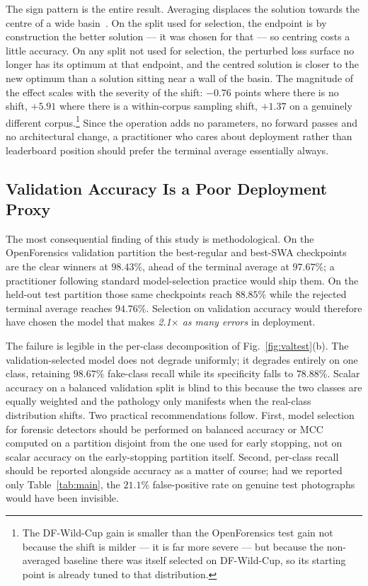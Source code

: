 \documentclass[10pt,journal]{IEEEtran}
\begin{document}
The sign pattern is the entire result. Averaging displaces the solution
towards the centre of a wide basin~\cite{izmailov2018swa}. On the split used
for selection, the endpoint is by construction the better solution --- it was
chosen for that --- so centring costs a little accuracy. On any split not used
for selection, the perturbed loss surface no longer has its optimum at that
endpoint, and the centred solution is closer to the new optimum than a
solution sitting near a wall of the basin. The magnitude of the effect scales
with the severity of the shift: $-0.76$ points where there is no shift,
$+5.91$ where there is a within-corpus sampling shift, $+1.37$ on a genuinely
different corpus.\footnote{The DF-Wild-Cup gain is smaller than the
OpenForensics test gain not because the shift is milder --- it is far more
severe --- but because the non-averaged baseline there was itself selected on
DF-Wild-Cup, so its starting point is already tuned to that distribution.}
Since the operation adds no parameters, no forward passes and no
architectural change, a practitioner who cares about deployment rather than
leaderboard position should prefer the terminal average essentially always.

\subsection{Validation Accuracy Is a Poor Deployment Proxy}
The most consequential finding of this study is methodological. On the
OpenForensics validation partition the best-regular and best-SWA checkpoints
are the clear winners at $98.43\%$, ahead of the terminal average at
$97.67\%$; a practitioner following standard model-selection practice would
ship them. On the held-out test partition those same checkpoints reach
$88.85\%$ while the rejected terminal average reaches $94.76\%$. Selection on
validation accuracy would therefore have chosen the model that makes
\emph{2.1$\times$ as many errors} in deployment.

The failure is legible in the per-class decomposition of
Fig.~\ref{fig:valtest}(b). The validation-selected model does not degrade
uniformly; it degrades entirely on one class, retaining $98.67\%$ fake-class
recall while its specificity falls to $78.88\%$. Scalar accuracy on a balanced
validation split is blind to this because the two classes are equally
weighted and the pathology only manifests when the real-class distribution
shifts. Two practical recommendations follow. First, model selection for
forensic detectors should be performed on balanced accuracy or MCC computed on
a partition disjoint from the one used for early stopping, not on scalar
accuracy on the early-stopping partition itself. Second, per-class recall
should be reported alongside accuracy as a matter of course; had we reported
only Table~\ref{tab:main}, the $21.1\%$ false-positive rate on genuine test
photographs would have been invisible.
\end{document}
